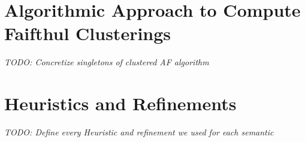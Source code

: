 \newpage

\section{Algorithmic Approach to Compute Faifthul Clusterings}
\label{sec:AlgorithmicApproachToComputeFaifthulClusterings}
\textit{TODO: Concretize singletons of clustered AF algorithm}

\section{Heuristics and Refinements}
\label{sec:HeuristicsAndRefinements}
\textit{TODO: Define every Heuristic and refinement we used for each semantic}
